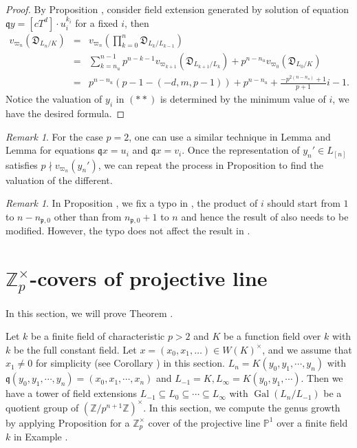 \documentclass{proc-l}
\theoremstyle{definition}
\theoremstyle{remark}
\newtheorem{remark}[theorem]{Remark}
\numberwithin{equation}{section}
\DeclareMathOperator{\Gal}{Gal}
\begin{document}
\begin{proof}
   By Proposition \boxed{\ref{4.12}}, consider field extension generated by solution of equation $\mathfrak qy=[cT^d]\cdot u_i^{k_i}$ for a fixed $i$, then
    \begin{eqnarray*}
    v_{\varpi_n}(\mathfrak D_{L_{n}/K})&=&v_{\varpi_n}(\prod_{k=0}^n\mathfrak D_{L_{k}/L_{k-1}})\\
    &=&\sum_{k=n_u}^{n-1}p^{n-k-1}v_{\varpi_{k+1}}(\mathfrak D_{L_{k+1}/L_{k}})+p^{n-n_u}v_{\varpi_0}(\mathfrak D_{L_{0}/K})\\
    &=&p^{n-n_u}(p-1-(-d,m,p-1))+p^{n-n_u}+\frac{-p^{2(n-n_u)}+1}{p+1}i-1.
    \end{eqnarray*}
Notice the valuation of $y_i$ in $(**)$ is determined by the minimum value of $i$, we have the desired formula. 
\end{proof}

\begin{remark}
    For the case $p=2$, one can use a similar technique in Lemma \boxed{\ref{4.8}} and Lemma \boxed{\ref{4.9}} for equations $\mathfrak qx=u_i$ and $\mathfrak qx=v_i$. Once the representation of $y_n'\in L_{[n]}$ satisfies $p\nmid v_{\varpi_n}(y_n')$, we can repeat the process in Proposition \boxed{\ref{4.12}} to find the valuation of the different.
\end{remark}
\begin{remark}
    In Proposition \boxed{\ref{4.13}}, we fix a typo in \cite[Proposition 5.1]{MR3754335}, the product of $i$ should start from $1$ to $n-n_{\mathfrak p,0}$ other than from $n_{\mathfrak p,0}+1$ to $n$ and hence the result of \cite[Proposition 5.3]{MR3754335} also needs to be modified. However, the typo does not affect the result in \cite[Proposition 5.5]{MR3754335}.
\end{remark}
\section{$\mathbb Z_p^\times$-covers of projective line}\label{sec5}
In this section, we will prove Theorem \boxed{\ref{1.5}}.

Let $k$ be a finite field of characteristic $p>2$ and $K$ be a function field over $k$ with $k$ be the full constant field. Let $x=(x_0,x_1,\dots)\in W(K)^\times$, and we assume that %
$x_1\neq0$ for simplicity (see Corollary \boxed{\ref{2.10}}) in this section. 
$L_{n}=K(y_0,y_1,\cdots,y_{n})$ with $\mathfrak q(y_0,y_1,\cdots,y_n)=(x_0,x_1,\cdots,x_{n})$ and $L_{-1}=K,L_{\infty}=K(y_0,y_1,\cdots)$. Then we have a tower of field extensions $L_{-1}\subseteq L_{0}\subseteq\cdots\subseteq L_{\infty}$ with $\Gal(L_{n}/L_{-1})$ be a quotient group of $(\mathbb Z/p^{n+1}\mathbb Z)^\times$. In this section, we compute the genus growth by applying Proposition \boxed{\ref{4.13}} for a $\mathbb Z_p^\times$ cover of the projective line $\mathbb P^1$ over a finite field $k$ in Example \boxed{\ref{6.4}}.
\end{document}

